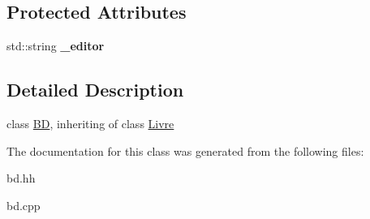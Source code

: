 \subsection*{Protected Attributes}
\begin{DoxyCompactItemize}
\item 
\hypertarget{classBD_ac9bd35f0626ee0d32b97ec7467dce17c}{
std::string {\bfseries \_\-editor}}
\label{classBD_ac9bd35f0626ee0d32b97ec7467dce17c}

\end{DoxyCompactItemize}


\subsection{Detailed Description}
class \hyperlink{classBD}{BD}, inheriting of class \hyperlink{classLivre}{Livre} 

The documentation for this class was generated from the following files:\begin{DoxyCompactItemize}
\item 
bd.hh\item 
bd.cpp\end{DoxyCompactItemize}
